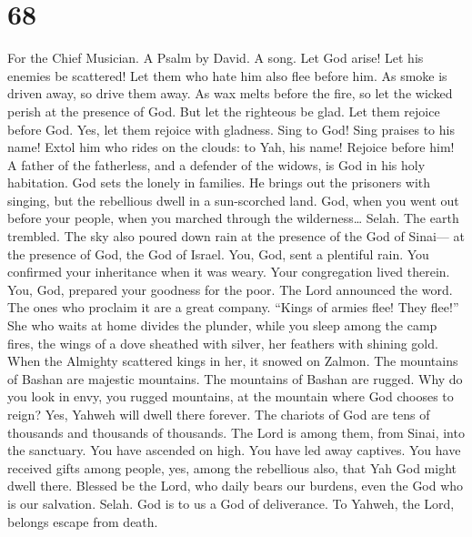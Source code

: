 \hypertarget{section-67}{%
\section{68}\label{section-67}}

For the Chief Musician. A Psalm by David. A song.  Let God
arise! Let his enemies be scattered! Let them who hate him also flee
before him.  As smoke is driven away, so drive them away.
As wax melts before the fire, so let the wicked perish at the presence
of God.  But let the righteous be glad. Let them rejoice
before God. Yes, let them rejoice with gladness.  Sing to
God! Sing praises to his name! Extol him who rides on the clouds: to
Yah, his name! Rejoice before him!  A father of the
fatherless, and a defender of the widows, is God in his holy habitation.
 God sets the lonely in families. He brings out the
prisoners with singing, but the rebellious dwell in a sun-scorched land.
 God, when you went out before your people, when you
marched through the wilderness\ldots{} Selah.  The earth
trembled. The sky also poured down rain at the presence of the God of
Sinai--- at the presence of God, the God of Israel.  You,
God, sent a plentiful rain. You confirmed your inheritance when it was
weary.  Your congregation lived therein. You, God,
prepared your goodness for the poor.  The Lord announced
the word. The ones who proclaim it are a great company. 
``Kings of armies flee! They flee!'' She who waits at home divides the
plunder,  while you sleep among the camp fires, the wings
of a dove sheathed with silver, her feathers with shining gold.
 When the Almighty scattered kings in her, it snowed on
Zalmon.  The mountains of Bashan are majestic mountains.
The mountains of Bashan are rugged.  Why do you look in
envy, you rugged mountains, at the mountain where God chooses to reign?
Yes, Yahweh will dwell there forever.  The chariots of
God are tens of thousands and thousands of thousands. The Lord is among
them, from Sinai, into the sanctuary.  You have ascended
on high. You have led away captives. You have received gifts among
people, yes, among the rebellious also, that Yah God might dwell there.
 Blessed be the Lord, who daily bears our burdens, even
the God who is our salvation. Selah.  God is to us a God
of deliverance. To Yahweh, the Lord, belongs escape from death.
